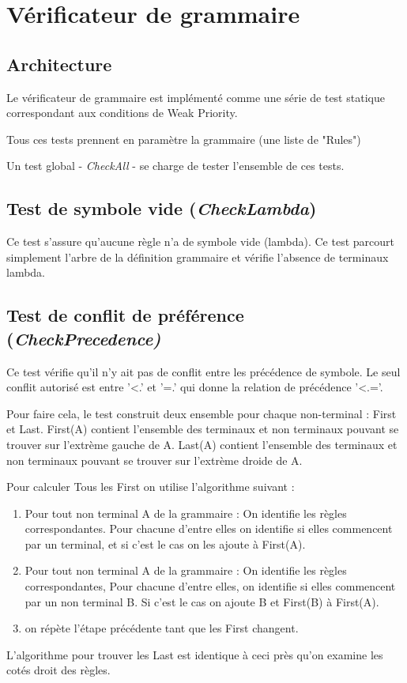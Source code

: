 \section{Vérificateur de grammaire}
	\subsection{Architecture}
	Le vérificateur de grammaire est implémenté comme une série de test
	statique correspondant aux conditions de Weak Priority.
	
	Tous ces tests prennent en paramètre la grammaire (une liste de "Rules")

	Un test global - \emph{CheckAll} - se charge de tester l'ensemble de ces tests.

	\subsection{Test de symbole vide (\emph{CheckLambda})}
		Ce test s'assure qu'aucune règle n'a de symbole vide (lambda).
		Ce test parcourt simplement l'arbre de la définition grammaire et
		vérifie l'absence de terminaux lambda.
	\subsection{Test de conflit de préférence (\emph{CheckPrecedence)}}
		Ce test vérifie qu'il n'y ait pas de conflit entre les précédence
		de symbole. Le seul conflit autorisé est entre '<.' et '=.' qui donne
		la relation de précédence '<.='.

		Pour faire cela, le test construit deux ensemble pour chaque non-terminal :
		First et Last. First(A) contient l'ensemble des terminaux et non terminaux 
		pouvant se trouver sur l'extrème gauche de A. Last(A) contient l'ensemble
		des terminaux et non terminaux pouvant se trouver sur l'extrème droide de A. 

		Pour calculer Tous les First on utilise l'algorithme suivant :
		\begin{enumerate}
			\item Pour tout non terminal A de la grammaire : On identifie les règles correspondantes.
			Pour chacune d'entre elles on identifie si elles commencent par un terminal, et si
			c'est le cas on les ajoute à First(A).
			\item Pour tout non terminal A de la grammaire : On identifie les règles correspondantes,
			Pour chacune d'entre elles, on identifie si elles commencent par un non terminal B.
			Si c'est le cas on ajoute B et First(B) à First(A). 
			\item on répète l'étape précédente tant que les First changent.
		\end{enumerate}
		L'algorithme pour trouver les Last est identique à ceci près qu'on examine les cotés droit des règles.
		

